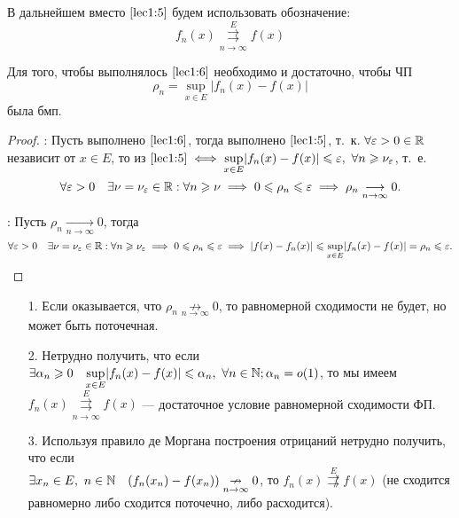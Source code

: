 \documentclass[../../main.tex]{subfiles}
\begin{document}
В дальнейшем вместо $\eqref{lec1:5}$ будем использовать обозначение:
\begin{equation}
\label{lec1:6}
f_n(x) \overset{E}{\underset{n \to \infty}\rightrightarrows} f(x)
\end{equation}
\begin{thm} 
Для того, чтобы выполнялось $\eqref{lec1:6}$ необходимо и достаточно, чтобы
ЧП \begin{equation}
\label{lec1:7}
\rho_n = \underset{x \in E}{\sup}|f_n(x) - f(x)| 
\end{equation} была бмп.
\end{thm}
\begin{proof}
 \;

 \nec: Пусть выполнено $\eqref{lec1:6}$, тогда выполнено $\eqref{lec1:5}$,
 т.~к. $\forall \varepsilon > 0 \in \mathbb{R}$ независит от $x \in E$, 
 то из $\eqref{lec1:5} \iff 
 \underset{x \in E}{\sup}|f_n(x) - f(x)| \leq \eps,\ 
 \forall n \geq \nu_\eps$, т.~е.
 \[\forall \varepsilon > 0 \quad \exists \nu = \nu_\varepsilon \in \mathbb{R} : 
 \forall n \geqslant \nu \implies 
 0 \leqslant \rho_n \leqslant \varepsilon \implies 
 \rho_n \underset{n \to \infty}{\longrightarrow}0.\]

 \suff: Пусть $\rho_n \underset{n \to \infty}{\longrightarrow}0$, тогда
\[\forall \varepsilon > 0 \quad \exists \nu = \nu_\varepsilon \in \mathbb{R} :
\forall n \geqslant \nu_\varepsilon \implies  
0 \leqslant \rho_n \leqslant \varepsilon \implies |f(x)-f_n(x)| \leqslant 
\underset{x \in E}{\sup}|f_n(x) - f(x)|
= \rho_n \leqslant \varepsilon. \qedhere\]
\end{proof}

\begin{rem}
	\;
 \begin{itemize}
		\item[1.] Если оказывается, что 
$\rho_n \underset{n \to \infty}{\not \rightarrow}0$, 
то равномерной сходимости не будет, но может быть поточечная.

		\item[2.] Нетрудно получить, что если $\exists \alpha_n \geqslant 0 \quad 
\underset{x \in E}{\sup}|f_n(x) - f(x)| \leqslant \alpha_n,\ \forall n \in \mathbb{N};
\alpha_n = o(1)$, то мы имеем
$f_n(x) \overset{E}{\underset{n \to \infty}\rightrightarrows} f(x)$ ---
достаточное условие равномерной сходимости ФП.

		\item[3.] Используя правило де Моргана 
построения отрицаний нетрудно получить,
что если \\ $\exists x_n \in E,\ n \in \mathbb{N} \quad (f_n(x_n) - f(x_n))
\underset{n \to \infty}{\nrightarrow}0$, то 
$f_n(x) \overset{E}{\not \rightrightarrows} f(x)$ (не сходится 
равномерно либо сходится поточечно, либо расходится).
 \end{itemize}	
\end{rem}	
\end{document}
